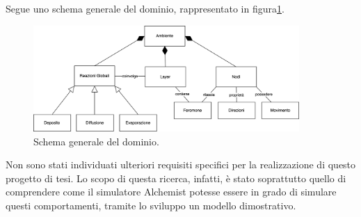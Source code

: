 Segue uno schema generale del dominio, rappresentato in figura\space\ref{fig:generale}.
\begin{figure}[ht]
    \centering
    \includegraphics[width=0.9\textwidth]{figures/generale.png}
    \caption{Schema generale del dominio.}\label{fig:generale}
\end{figure}\newline

Non sono stati individuati ulteriori requisiti specifici per la realizzazione di questo progetto di tesi.
Lo scopo di questa ricerca, infatti, è stato soprattutto quello di comprendere come il simulatore Alchemist 
potesse essere in grado di simulare questi comportamenti, tramite lo sviluppo un modello
dimostrativo.